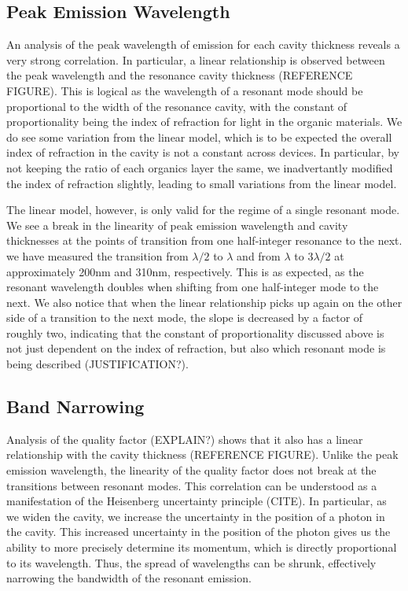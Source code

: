 \documentclass{report}
\begin{document}
        \subsection{Peak Emission Wavelength}
            An analysis of the peak wavelength of emission for each cavity thickness reveals a very strong correlation. In particular, a linear relationship is observed between the peak wavelength and the resonance cavity thickness (REFERENCE FIGURE). This is logical as the wavelength of a resonant mode should be proportional to the width of the resonance cavity, with the constant of proportionality being the index of refraction for light in the organic materials. We do see some variation from the linear model, which is to be expected the overall index of refraction in the cavity is not a constant across devices. In particular, by not keeping the ratio of each organics layer the same, we inadvertantly modified the index of refraction slightly, leading to small variations from the linear model.
            
            The linear model, however, is only valid for the regime of a single resonant mode. We see a break in the linearity of peak emission wavelength and cavity thicknesses at the points of transition from one half-integer resonance to the next. we have measured the transition from $\lambda/2$ to $\lambda$ and from $\lambda$ to $3\lambda/2$ at approximately 200nm and 310nm, respectively. This is as expected, as the resonant wavelength doubles when shifting from one half-integer mode to the next. We also notice that when the linear relationship picks up again on the other side of a transition to the next mode, the slope is decreased by a factor of roughly two, indicating that the constant of proportionality discussed above is not just dependent on the index of refraction, but also which resonant mode is being described (JUSTIFICATION?).
        
        \subsection{Band Narrowing}
            Analysis of the quality factor (EXPLAIN?) shows that it also has a linear relationship with the cavity thickness (REFERENCE FIGURE). Unlike the peak emission wavelength, the linearity of the quality factor does not break at the transitions between resonant modes. This correlation can be understood as a manifestation of the Heisenberg uncertainty principle (CITE). In particular, as we widen the cavity, we increase the uncertainty in the position of a photon in the cavity. This increased uncertainty in the position of the photon gives us the ability to more precisely determine its momentum, which is directly proportional to its wavelength. Thus, the spread of wavelengths can be shrunk, effectively narrowing the bandwidth of the resonant emission.
\end{document}
